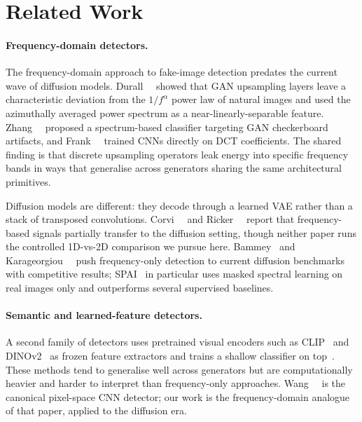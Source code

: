 \section{Related Work}
\label{sec:related}

\paragraph{Frequency-domain detectors.}
The frequency-domain approach to fake-image detection predates the current wave of diffusion models. Durall~\etal~\cite{durall2020watch} showed that GAN upsampling layers leave a characteristic deviation from the $1/f^{\alpha}$ power law of natural images and used the azimuthally averaged power spectrum as a near-linearly-separable feature. Zhang~\etal~\cite{zhang2019detecting} proposed a spectrum-based classifier targeting GAN checkerboard artifacts, and Frank~\etal~\cite{frank2020leveraging} trained CNNs directly on DCT coefficients. The shared finding is that discrete upsampling operators leak energy into specific frequency bands in ways that generalise across generators sharing the same architectural primitives.

Diffusion models are different: they decode through a learned VAE rather than a stack of transposed convolutions. Corvi~\etal~\cite{corvi2023intriguing} and Ricker~\etal~\cite{ricker2024aeroblade} report that frequency-based signals partially transfer to the diffusion setting, though neither paper runs the controlled 1D-vs-2D comparison we pursue here. Bammey~\cite{synthbuster2023} and Karageorgiou~\etal~\cite{spai2025} push frequency-only detection to current diffusion benchmarks with competitive results; SPAI~\cite{spai2025} in particular uses masked spectral learning on real images only and outperforms several supervised baselines.

\paragraph{Semantic and learned-feature detectors.}
A second family of detectors uses pretrained visual encoders such as CLIP~\cite{radford2021clip} and DINOv2~\cite{oquab2023dinov2} as frozen feature extractors and trains a shallow classifier on top~\cite{ojha2023univfd,cozzolino2024raising}. These methods tend to generalise well across generators but are computationally heavier and harder to interpret than frequency-only approaches. Wang~\etal~\cite{wang2020cnn} is the canonical pixel-space CNN detector; our work is the frequency-domain analogue of that paper, applied to the diffusion era.

